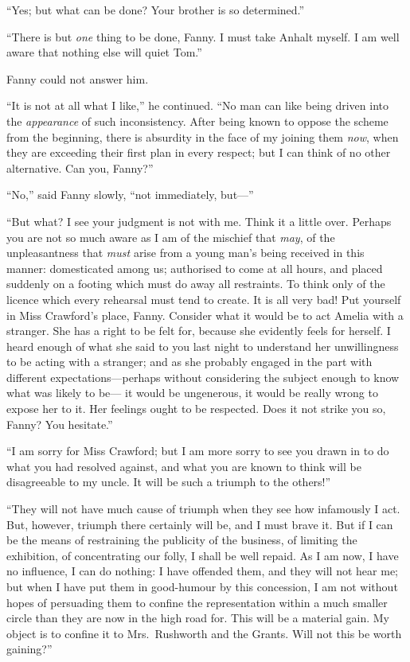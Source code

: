 ``Yes; but what can be done?  Your brother is so determined.''

``There is but \emph{one} thing to be done, Fanny.  I must
take Anhalt myself.  I am well aware that nothing else
will quiet Tom.''

Fanny could not answer him.

``It is not at all what I like,'' he continued.  ``No man can
like being driven into the \emph{appearance} of such inconsistency.
After being known to oppose the scheme from the beginning,
there is absurdity in the face of my joining them \emph{now},
when they are exceeding their first plan in every respect;
but I can think of no other alternative.  Can you, Fanny?''

``No,'' said Fanny slowly, ``not immediately, but---''

``But what?  I see your judgment is not with me.  Think it
a little over.  Perhaps you are not so much aware as I am
of the mischief that \emph{may}, of the unpleasantness that \emph{must}
arise from a young man's being received in this manner:
domesticated among us; authorised to come at all hours,
and placed suddenly on a footing which must do away
all restraints.  To think only of the licence which every
rehearsal must tend to create.  It is all very bad!
Put yourself in Miss Crawford's place, Fanny.
Consider what it would be to act Amelia with a stranger.
She has a right to be felt for, because she evidently
feels for herself.  I heard enough of what she said to you
last night to understand her unwillingness to be acting
with a stranger; and as she probably engaged in the part
with different expectations---perhaps without considering
the subject enough to know what was likely to be---%
it would be ungenerous, it would be really wrong to
expose her to it.  Her feelings ought to be respected.
Does it not strike you so, Fanny?  You hesitate.''

``I am sorry for Miss Crawford; but I am more sorry to see
you drawn in to do what you had resolved against, and what
you are known to think will be disagreeable to my uncle.
It will be such a triumph to the others!''

``They will not have much cause of triumph when they
see how infamously I act.  But, however, triumph there
certainly will be, and I must brave it.  But if I can be
the means of restraining the publicity of the business,
of limiting the exhibition, of concentrating our folly,
I shall be well repaid.  As I am now, I have no influence,
I can do nothing:  I have offended them, and they will
not hear me; but when I have put them in good-humour
by this concession, I am not without hopes of persuading
them to confine the representation within a much
smaller circle than they are now in the high road for.
This will be a material gain.  My object is to confine
it to Mrs.\ Rushworth and the Grants.  Will not this be
worth gaining?''

